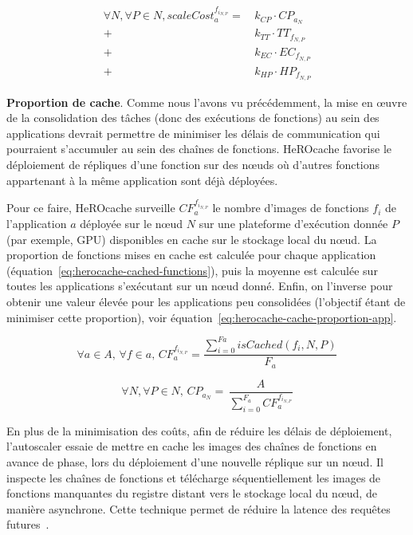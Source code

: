 \begin{equation}
\begin{split}
 \forall N, \forall P \in N, scaleCost^{{f}_{{i}_{N, P}}}_{a} = \,   &k_{CP} \cdot {CP}_{{a}_{N}}    \\
    + &k_{TT} \cdot {TT}_{{f}_{N, P}} \\
    + &k_{EC} \cdot {EC}_{{f}_{N, P}} \\
    + &k_{HP} \cdot {HP}_{{f}_{N, P}}
\end{split}
\label{eq:herocache-scale-cost-function}
\end{equation}

\textbf{Proportion de cache}. Comme nous l'avons vu précédemment, la mise en œuvre de la consolidation des tâches (donc des exécutions de fonctions) au sein des applications devrait permettre de minimiser les délais de communication qui pourraient s'accumuler au sein des chaînes de fonctions. HeROcache favorise le déploiement de répliques d'une fonction sur des nœuds où d'autres fonctions appartenant à la même application sont déjà déployées.

Pour ce faire, HeROcache surveille $CF_{a}^{{f}_{i_{N, P}}}$ le nombre d'images de fonctions ${f}_{i}$ de l'application $a$ déployée sur le nœud $N$ sur une plateforme d'exécution donnée $P$ (par exemple, GPU) disponibles en cache sur le stockage local du nœud. La proportion de fonctions mises en cache est calculée pour chaque application (équation~\ref{eq:herocache-cached-functions}), puis la moyenne est calculée sur toutes les applications s'exécutant sur un nœud donné. Enfin, on l'inverse pour obtenir une valeur élevée pour les applications peu consolidées (l'objectif étant de minimiser cette proportion), voir équation~\ref{eq:herocache-cache-proportion-app}.

\begin{equation}
    \forall a \in A, \, \forall f \in a, \, CF_{a}^{{f}_{i_{N, P}}} = \frac{\sum_{i = 0}^{Fa} isCached(f_{i}, N, P)}{F_{a}}
\label{eq:herocache-cached-functions}
\end{equation}

\begin{equation}
    \forall N, \forall P \in N, \, {CP}_{{a}_{N}} = \, \frac{A}{\sum_{i = 0}^{F_{a}} CF_{a}^{{f}_{i_{N, P}}}}
\label{eq:herocache-cache-proportion-app}
\end{equation}

En plus de la minimisation des coûts, afin de réduire les délais de déploiement, l'autoscaler essaie de mettre en cache les images des chaînes de fonctions en avance de phase, lors du déploiement d'une nouvelle réplique sur un nœud. Il inspecte les chaînes de fonctions et télécharge séquentiellement les images de fonctions manquantes du registre distant vers le stockage local du nœud, de manière asynchrone. Cette technique permet de réduire la latence des requêtes futures~\cite{leeSPESOptimizingPerformanceResource2024a}.

